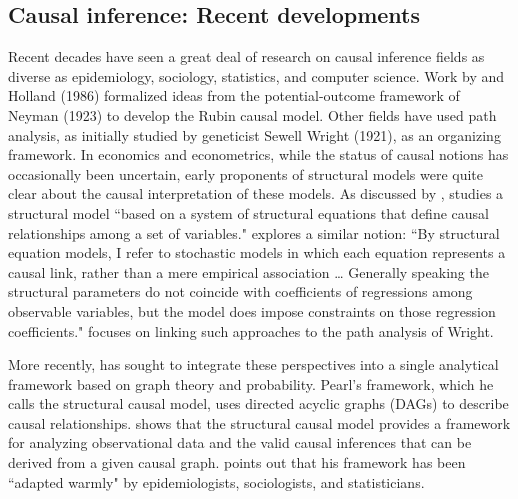 \documentclass[11pt,reqno]{amsart}
\begin{document}
\subsection{Causal inference: Recent developments}
Recent decades have seen a great deal of research on causal inference fields as diverse as epidemiology, sociology, statistics, and computer science. 
Work by \citet{Rubin:1974im,Rubin:1977dv} and Holland (1986) formalized ideas from the potential-outcome framework of Neyman (1923) to develop the Rubin causal model. %
Other fields have used path analysis, as initially studied by geneticist Sewell Wright (1921), as an organizing framework.
In economics and econometrics, while the status of causal notions has occasionally been uncertain, early proponents of structural models were quite clear about the causal interpretation of these models.
As discussed by \citet{Heckman:2015ez}, \citet{Haavelmo:1943cl,Haavelmo:1944jq} studies a structural model ``based on a system of structural equations that define causal relationships among a set of variables."
\citet[p.\,979]{Goldberger:1972cq} explores a similar notion: ``By structural equation models, I refer to stochastic models in which each equation represents a causal link, rather than a mere empirical association \dots
Generally speaking the structural parameters do not coincide with coefficients of regressions among observable variables, but the model does impose constraints on those regression coefficients."
\citet[p.\,979]{Goldberger:1972cq} focuses on linking such approaches to the path analysis of Wright.

More recently, \citet{Pearl:2009kh} has sought to integrate these perspectives into a single analytical framework based on graph theory and probability.
Pearl's framework, which he calls the structural causal model, uses directed acyclic graphs (DAGs) to describe causal relationships.
\citet{Pearl:2009kh} shows that the structural causal model provides a framework for analyzing observational data and the valid causal inferences that can be derived from a given causal graph.
\citet[p.\,698]{Pearl:2011jd} points out that his framework has been ``adapted warmly" by epidemiologists, sociologists, and statisticians.
\end{document}
